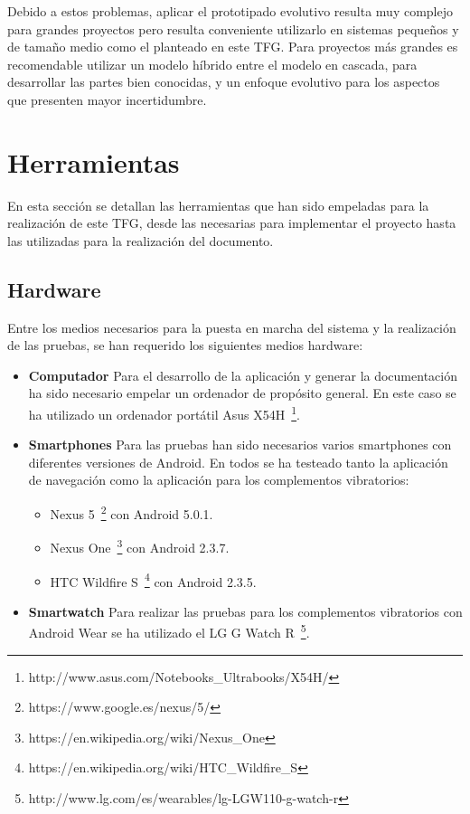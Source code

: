 Debido a estos problemas, aplicar el prototipado evolutivo resulta muy complejo para grandes
proyectos pero resulta conveniente utilizarlo en sistemas pequeños y de tamaño medio como el
planteado en este \acs{TFG}. Para proyectos más grandes es recomendable utilizar un modelo híbrido
entre el modelo en cascada, para desarrollar las partes bien conocidas, y un enfoque evolutivo para
los aspectos que presenten mayor incertidumbre.

\section{Herramientas}

En esta sección se detallan las herramientas que han sido empeladas para la realización de este
\acs{TFG}, desde las necesarias para implementar el proyecto hasta las utilizadas para la
realización del documento.

\subsection{Hardware}
\label{sec:herramientasHardware}

Entre los medios necesarios para la puesta en marcha del sistema y la realización de las pruebas, se
han requerido los siguientes medios hardware:

\begin{itemize}
  \item \textbf{Computador} Para el desarrollo de la aplicación y generar la documentación ha sido
    necesario empelar un ordenador de propósito general. En este caso se ha utilizado un ordenador
    portátil Asus X54H~\footnote{http://www.asus.com/Notebooks\_Ultrabooks/X54H/}.

  \item \textbf{Smartphones} Para las pruebas han sido necesarios varios smartphones con diferentes
    versiones de Android. En todos se ha testeado tanto la aplicación de navegación como la
    aplicación para los complementos vibratorios:
    \begin{itemize}
      \item Nexus 5~\footnote{https://www.google.es/nexus/5/} con Android 5.0.1.
      \item Nexus One~\footnote{https://en.wikipedia.org/wiki/Nexus\_One} con Android 2.3.7.
      \item HTC Wildfire S~\footnote{https://en.wikipedia.org/wiki/HTC\_Wildfire\_S} con Android
        2.3.5.
    \end{itemize}

  \item \textbf{Smartwatch} Para realizar las pruebas para los complementos vibratorios con Android
    Wear se ha utilizado el LG G Watch
    R~\footnote{http://www.lg.com/es/wearables/lg-LGW110-g-watch-r}.

\end{itemize}

